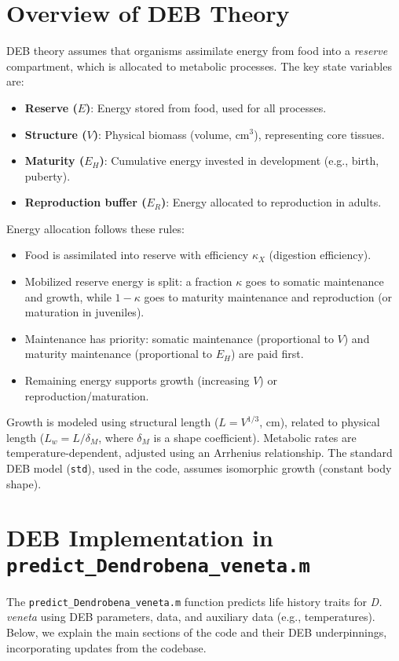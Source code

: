 \documentclass[11pt]{article}
\begin{document}
\section{Overview of DEB Theory}
DEB theory assumes that organisms assimilate energy from food into a \textit{reserve} compartment, which is allocated to metabolic processes. The key state variables are:
\begin{itemize}
    \item \textbf{Reserve ($E$)}: Energy stored from food, used for all processes.
    \item \textbf{Structure ($V$)}: Physical biomass (volume, cm$^3$), representing core tissues.
    \item \textbf{Maturity ($E_H$)}: Cumulative energy invested in development (e.g., birth, puberty).
    \item \textbf{Reproduction buffer ($E_R$)}: Energy allocated to reproduction in adults.
\end{itemize}

Energy allocation follows these rules:
\begin{itemize}
    \item Food is assimilated into reserve with efficiency $\kappa_X$ (digestion efficiency).
    \item Mobilized reserve energy is split: a fraction $\kappa$ goes to somatic maintenance and growth, while $1-\kappa$ goes to maturity maintenance and reproduction (or maturation in juveniles).
    \item Maintenance has priority: somatic maintenance (proportional to $V$) and maturity maintenance (proportional to $E_H$) are paid first.
    \item Remaining energy supports growth (increasing $V$) or reproduction/maturation.
\end{itemize}

Growth is modeled using structural length ($L = V^{1/3}$, cm), related to physical length ($L_w = L / \delta_M$, where $\delta_M$ is a shape coefficient). Metabolic rates are temperature-dependent, adjusted using an Arrhenius relationship. The standard DEB model (\texttt{std}), used in the code, assumes isomorphic growth (constant body shape).

\section{DEB Implementation in \texttt{predict\_Dendrobena\_veneta.m}}
The \texttt{predict\_Dendrobena\_veneta.m} function predicts life history traits for \textit{D. veneta} using DEB parameters, data, and auxiliary data (e.g., temperatures). Below, we explain the main sections of the code and their DEB underpinnings, incorporating updates from the codebase.
\end{document}
